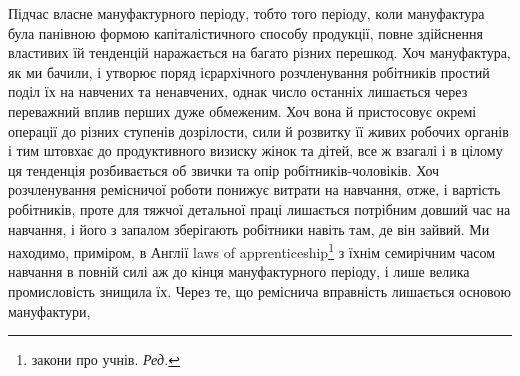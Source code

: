 Підчас власне мануфактурного періоду, тобто того періоду,
коли мануфактура була панівною формою капіталістичного способу
продукції, повне здійснення властивих їй тенденцій наражається
на багато різних перешкод. Хоч мануфактура, як ми
бачили, і утворює поряд ієрархічного розчленування робітників
простий поділ їх на навчених та ненавчених, однак число останніх
лишається через переважний вплив перших дуже обмеженим.
Хоч вона й пристосовує окремі операції до різних ступенів дозрілости,
сили й розвитку її живих робочих органів і тим штовхає
до продуктивного визиску жінок та дітей, все ж взагалі і в цілому
ця тенденція розбивається об звички та опір робітників-чоловіків.
Хоч розчленування ремісничої роботи понижує витрати на
навчання, отже, і вартість робітників, проте для тяжчої детальної
праці лишається потрібним довший час на навчання, і його
з запалом зберігають робітники навіть там, де він зайвий. Ми
находимо, приміром, в Англії laws of apprenticeship\footnote*{
закони про учнів. \emph{Ред.}
} з їхнім
семирічним часом навчання в повній силі аж до кінця мануфактурного
періоду, і лише велика промисловість знищила їх. Через
те, що реміснича вправність лишається основою мануфактури,
\parbreak{}  %
